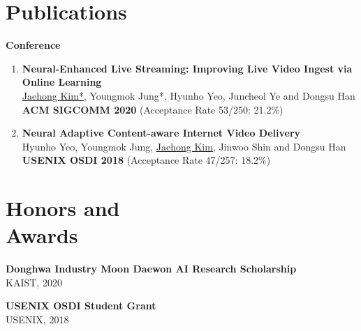 \documentclass[margin,line,letter]{cv}
\def \pubitem {\vspace{0.08in}\item}
\begin{document}
\begin{resume}
\vspace{0.5cm}

\section{\sc Publications \\}
\textbf{Conference}
\begin{enumerate}
	\pubitem {\textbf{Neural-Enhanced Live Streaming: Improving Live Video Ingest via Online Learning} \\ \underline{Jaehong Kim*}, Youngmok Jung*, Hyunho Yeo, Juncheol Ye and Dongsu Han \\ \textbf{ACM SIGCOMM 2020} (Acceptance Rate 53/250: 21.2\%)}
	\pubitem {\textbf{Neural Adaptive Content-aware Internet Video Delivery} \\ Hyunho Yeo, Youngmok Jung, \underline{Jaehong Kim}, Jinwoo Shin and Dongsu Han \\ \textbf{USENIX OSDI 2018} (Acceptance Rate 47/257: 18.2\%)}
\end{enumerate}

\vspace{0.3cm}


\vspace{0.3cm}




\section{\sc Honors and\\ Awards \\}
	\textbf{Donghwa Industry Moon Daewon AI Research Scholarship} \\ KAIST, 2020 \par 
	\textbf{USENIX OSDI Student Grant} \\ USENIX, 2018 \par 

\vspace{0.5cm}


\end{resume}
\end{document}
